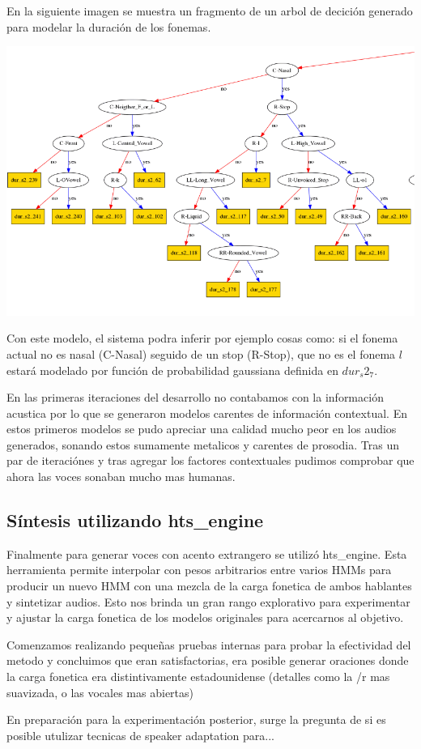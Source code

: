 En la siguiente imagen se muestra un fragmento de un arbol de decición generado para modelar la duración de los fonemas.

\includegraphics[scale=0.5]{imagenes/arbolDeDesicionTesis.png}

Con este modelo, el sistema podra inferir por ejemplo cosas como: si el fonema actual no es nasal (C-Nasal) seguido de un stop (R-Stop), que no es el fonema $l$ estará modelado por función de probabilidad gaussiana definida en $dur_s2_7$.

En las primeras iteraciones del desarrollo no contabamos con la información acustica por lo que se generaron modelos carentes de información contextual. En estos primeros modelos se pudo apreciar una calidad mucho peor en los audios generados, sonando estos sumamente metalicos y carentes de prosodia. Tras un par de iteraciónes y tras agregar los factores contextuales pudimos comprobar que ahora las voces sonaban mucho mas humanas.

\subsection{Síntesis utilizando hts\_engine}

Finalmente para generar voces con acento extrangero se utilizó hts\_engine. Esta herramienta permite interpolar con pesos arbitrarios entre varios HMMs para producir un nuevo HMM con una mezcla de la carga fonetica de ambos hablantes y sintetizar audios. Esto nos brinda un gran rango explorativo para experimentar y ajustar la carga fonetica de los modelos originales para acercarnos al objetivo. 


Comenzamos realizando pequeñas pruebas internas para probar la efectividad del metodo y concluimos que eran satisfactorias, era posible generar oraciones donde la carga fonetica era distintivamente estadounidense (detalles como la /r mas suavizada, o las vocales mas abiertas)


En preparación para la experimentación posterior, surge la pregunta de si es posible utulizar tecnicas de speaker adaptation para...

